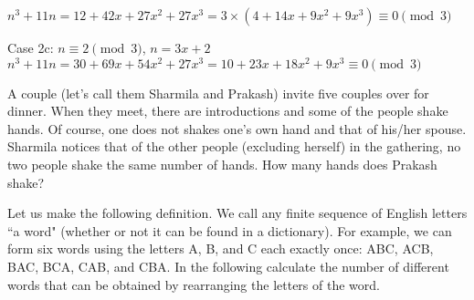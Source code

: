 \documentclass[12pt,answers]{exam}
\begin{document}
\begin{questions}
\begin{solution}
    \(n^3+11n = 12 + 42 x + 27 x^2 + 27 x^3 = 3\times(4 + 14 x + 9 x^2 + 9 x^3) \equiv 0 \pmod{3}\)

    Case 2c: \(n \equiv 2 \pmod{3} \), \(n=3x+2\)
    \(n^3+11n = 30 + 69 x + 54 x^2 + 27 x^3 = 10 + 23 x + 18 x^2 + 9 x^3 \equiv 0 \pmod{3}\)

\end{solution}
\question A couple (let's call them Sharmila and Prakash) invite five couples over for dinner. When they meet, there are introductions and some of the people shake hands. Of course, one does not shakes one's own hand and that of his/her spouse. Sharmila notices that of the other people (excluding herself) in the gathering, no two people shake the same number of hands. How many hands does Prakash shake?

\question Let us make the following definition. We call any finite sequence of English letters ``a word" (whether or not it can be found in a dictionary). For example, we can form six words using the letters A, B, and C each exactly once: ABC, ACB, BAC, BCA, CAB, and CBA. In the following calculate the number of different words that can be obtained by rearranging the letters of the word.
\end{questions}
\end{document}
